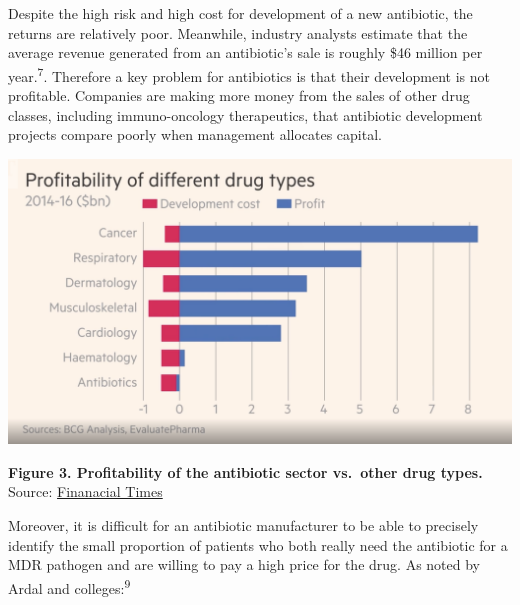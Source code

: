 \documentclass[
]{book}
\begin{document}
Despite the high risk and high cost for development of a new antibiotic, the returns are relatively poor. Meanwhile, industry analysts estimate that the average revenue generated from an antibiotic's sale is roughly \$46 million per year.\textsuperscript{7}. Therefore a key problem for antibiotics is that their development is not profitable. Companies are making more money from the sales of other drug classes, including immuno-oncology therapeutics, that antibiotic development projects compare poorly when management allocates capital.

\includegraphics[width=8.33333in,height=\textheight]{images/profitability.png}

\textbf{Figure 3. Profitability of the antibiotic sector vs.~other drug types.} Source: \href{https://www.ft.com/video/adada10f-5747-4976-a3e0-958b0165e0ef}{Finanacial Times}

Moreover, it is difficult for an antibiotic manufacturer to be able to precisely identify the small proportion of patients who both really need the antibiotic for a MDR pathogen and are willing to pay a high price for the drug. As noted by Ardal and colleges:\textsuperscript{9}
\end{document}
